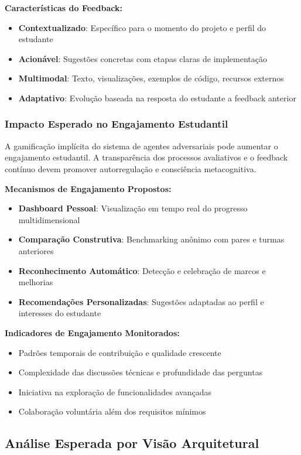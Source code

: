 \documentclass[english, spanish, brazilian]{modelo_dt}
\begin{document}
\textbf{Características do Feedback:}
\begin{itemize}
  \item \textbf{Contextualizado}: Específico para o momento do projeto e perfil do estudante
  \item \textbf{Acionável}: Sugestões concretas com etapas claras de implementação
  \item \textbf{Multimodal}: Texto, visualizações, exemplos de código, recursos externos
  \item \textbf{Adaptativo}: Evolução baseada na resposta do estudante a feedback anterior
\end{itemize}

\subsubsection{Impacto Esperado no Engajamento Estudantil}

A gamificação implícita do sistema de agentes adversariais pode aumentar o
engajamento estudantil. A transparência dos processos avaliativos e o feedback
contínuo devem promover autorregulação e consciência metacognitiva.

\textbf{Mecanismos de Engajamento Propostos:}
\begin{itemize}
  \item \textbf{Dashboard Pessoal}: Visualização em tempo real do progresso multidimensional
  \item \textbf{Comparação Construtiva}: Benchmarking anônimo com pares e turmas anteriores
  \item \textbf{Reconhecimento Automático}: Detecção e celebração de marcos e melhorias
  \item \textbf{Recomendações Personalizadas}: Sugestões adaptadas ao perfil e interesses do estudante
\end{itemize}

\textbf{Indicadores de Engajamento Monitorados:}
\begin{itemize}
  \item Padrões temporais de contribuição e qualidade crescente
  \item Complexidade das discussões técnicas e profundidade das perguntas
  \item Iniciativa na exploração de funcionalidades avançadas
  \item Colaboração voluntária além dos requisitos mínimos
\end{itemize}

\subsection{Análise Esperada por Visão Arquitetural}
\end{document}
